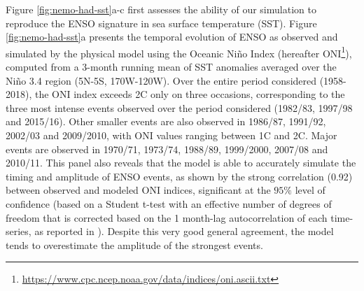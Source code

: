  Figure \ref{fig:nemo-had-sst}a-c first assesses the ability of our simulation to reproduce the ENSO signature in sea surface temperature (SST). Figure \ref{fig:nemo-had-sst}a presents the temporal evolution of ENSO as observed and simulated by the physical model using the Oceanic Niño Index (hereafter ONI\footnote{\url{https://www.cpc.ncep.noaa.gov/data/indices/oni.ascii.txt}}), computed from a 3-month running mean of SST anomalies averaged over the Niño 3.4 region (5N-5S, 170W-120W). Over the entire period considered (1958-2018), the ONI index exceeds 2\degree{}C only on three occasions, corresponding to the three most intense \nino{} events observed over the period considered (1982/83, 1997/98 and 2015/16). Other smaller \nino{} events are also observed in 1986/87, 1991/92, 2002/03 and 2009/2010, with ONI values ranging between 1\degree{}C and 2\degree{}C. Major \nina{} events are observed in 1970/71, 1973/74, 1988/89, 1999/2000, 2007/08 and 2010/11. This panel also reveals that the model is able to accurately simulate the timing and amplitude of ENSO events, as shown by the strong correlation (0.92) between observed and modeled ONI indices, significant at the $95\%$ level of confidence (based on a Student t-test with an effective number of degrees of freedom that is corrected based on the 1 month-lag autocorrelation of each time-series, as reported in \citealp{brethertonEffectiveNumberSpatial1999}). Despite this very good general agreement, the model tends to overestimate the amplitude of the strongest \nino{} events. 

